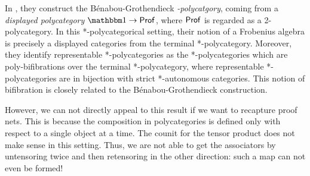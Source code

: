 In \cite{blanco}, they construct the B\'enabou-Grothendieck {\em *-polycatgory}, coming from a {\em displayed polycategory} $\one\to \Prof$, where ${\sf Prof}$ is regarded as a 2-polycategory.  In this *-polycategorical setting, their notion of a Frobenius algebra is precisely  a displayed categories from the terminal *-polycategory.
Moreover, they identify representable *-polycategories as the  *-polycategories which are poly-bifibrations over the terminal *-polycategory, where representable *-polycategories are in bijection with strict *-autonomous categories.  This notion of bifibration is closely related to the B\'enabou-Grothendieck construction. 


However, we can not directly appeal to this result if we want to recapture proof nets.  This is because the composition in polycategories is defined only with respect to a single object at a time. The counit for the tensor product does not make sense in this setting.  Thus, we are not able to get the associators by untensoring twice and then retensoring in the other direction:  such a map can not even be formed!

